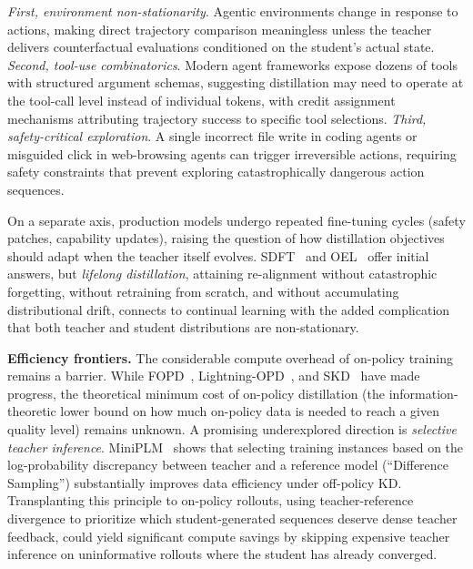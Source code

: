 \documentclass{article} %
\begin{document}
\emph{First, environment non-stationarity}. Agentic environments change in response to actions, making direct trajectory comparison meaningless unless the teacher delivers counterfactual evaluations conditioned on the student's actual state. \emph{Second, tool-use combinatorics}. Modern agent frameworks expose dozens of tools with structured argument schemas, suggesting distillation may need to operate at the tool-call level instead of individual tokens, with credit assignment mechanisms attributing trajectory success to specific tool selections. \emph{Third, safety-critical exploration}. A single incorrect file write in coding agents or misguided click in web-browsing agents can trigger irreversible actions, requiring safety constraints that prevent exploring catastrophically dangerous action sequences.

On a separate axis, production models undergo repeated fine-tuning cycles (safety patches, capability updates), raising the question of how distillation objectives should adapt when the teacher itself evolves. SDFT~\citep{2601.19897} and OEL~\citep{2603.16856} offer initial answers, but \emph{lifelong distillation}, attaining re-alignment without catastrophic forgetting, without retraining from scratch, and without accumulating distributional drift, connects to continual learning with the added complication that both teacher and student distributions are non-stationary.

\textbf{Efficiency frontiers.} The considerable compute overhead of on-policy training remains a barrier. While FOPD~\citep{2602.15260}, Lightning-OPD~\citep{2604.13010}, and SKD~\citep{2410.11325} have made progress, the theoretical minimum cost of on-policy distillation (the information-theoretic lower bound on how much on-policy data is needed to reach a given quality level) remains unknown. A promising underexplored direction is \emph{selective teacher inference}. MiniPLM~\citep{2410.17215} shows that selecting training instances based on the log-probability discrepancy between teacher and a reference model (``Difference Sampling'') substantially improves data efficiency under off-policy KD. Transplanting this principle to on-policy rollouts, using teacher-reference divergence to prioritize which student-generated sequences deserve dense teacher feedback, could yield significant compute savings by skipping expensive teacher inference on uninformative rollouts where the student has already converged.
\end{document}
